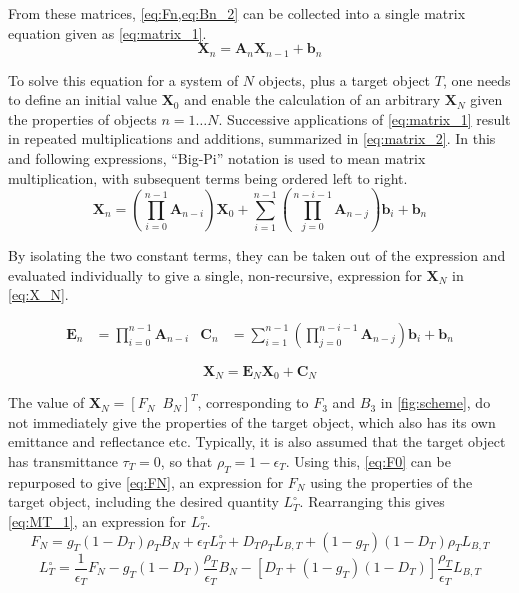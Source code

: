 \documentclass[11pt,a4paper]{article}
\begin{document}
From these matrices, \cref{eq:Fn,eq:Bn_2} can be collected into a single matrix equation given as \cref{eq:matrix_1}.
\begin{equation}\label{eq:matrix_1}
	\bm{X}_n = \bm{A}_n \bm{X}_{n-1} + \bm{b}_n
\end{equation}

To solve this equation for a system of $ N $ objects, plus a target object $ T $, one needs to define an initial value $ \bm{X}_0 $ and enable the calculation of an arbitrary $ \bm{X}_N $ given the properties of objects $ n = 1 \dots N $. Successive applications of \cref{eq:matrix_1} result in repeated multiplications and additions, summarized in \cref{eq:matrix_2}. In this and following expressions, ``Big-Pi'' notation is used to mean matrix multiplication, with subsequent terms being ordered left to right.
\begin{equation}\label{eq:matrix_2}
	\bm{X}_n = \left(\prod_{i=0}^{n-1} \bm{A}_{n-i}\right) \bm{X}_0 + \sum_{i=1}^{n-1} \left( \prod_{j=0}^{n-i-1} \bm{A}_{n-j} \right) \bm{b}_i + \bm{b}_n
\end{equation}

By isolating the two constant terms, they can be taken out of the expression and evaluated individually to give a single, non-recursive, expression for $ \bm{X}_N $ in \cref{eq:X_N}.

\begin{align*}
		\bm{E}_n &= \prod_{i=0}^{n-1} \bm{A}_{n-i} &
		\bm{C}_n &= \sum_{i=1}^{n-1} \left( \prod_{j=0}^{n-i-1} \bm{A}_{n-j} \right) \bm{b}_i + \bm{b}_n
\end{align*}

\begin{equation}\label{eq:X_N}
	\bm{X}_{N} = \bm{E}_N \bm{X}_0 + \bm{C}_N
\end{equation}

The value of $ \bm{X}_N = \left[F_N \enspace B_N\right]^T $, corresponding to $ F_3 $ and $ B_3 $ in \cref{fig:scheme}, do not immediately give the properties of the target object, which also has its own emittance and reflectance etc. Typically, it is also assumed that the target object has transmittance $ \tau_T = 0 $, so that $ \rho_T = 1 - \epsilon_T $. Using this, \cref{eq:F0} can be repurposed to give \cref{eq:FN}, an expression for $ F_N $ using the properties of the target object, including the desired quantity $ L^\circ_T $. Rearranging this gives \cref{eq:MT_1}, an expression for $ L^\circ_T $.
\begin{equation}\label{eq:FN}
	F_N = g_T \left(1 - D_T\right) \rho_T B_N + \epsilon_T L^\circ_T + D_T \rho_T L_{B,T} + \left(1 - g_T\right)\left(1 - D_T\right) \rho_T L_{B,T}
\end{equation}
\begin{equation}\label{eq:MT_1}
	L^\circ_T = \frac{1}{\epsilon_T} F_N - g_T \left(1 - D_T\right) \frac{\rho_T}{\epsilon_T} B_N - \left[D_T + \left(1 - g_T\right)\left(1 - D_T\right) \right] \frac{\rho_T}{\epsilon_T} L_{B,T}
\end{equation}
\end{document}
